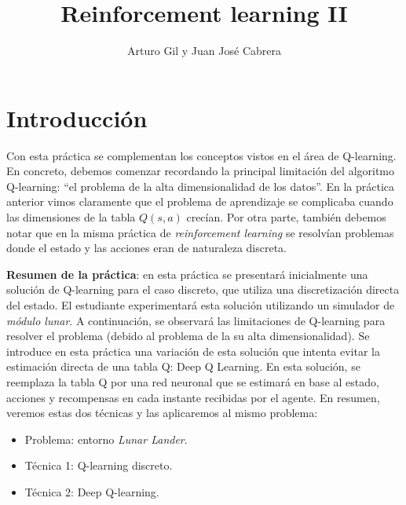 \documentclass{article}
\title{Reinforcement learning II}
\author{Arturo Gil y Juan José Cabrera}
\begin{document}
\maketitle

\section{Introducción}
Con esta práctica se complementan los conceptos vistos en el área de Q-learning. En concreto, debemos comenzar recordando la principal limitación del algoritmo Q-learning: ``el problema de la alta dimensionalidad de los datos''. En la práctica anterior vimos claramente que el problema de aprendizaje se complicaba cuando las dimensiones de la tabla $Q(s, a)$ crecían. Por otra parte, también debemos notar que en la misma práctica de \textit{reinforcement learning} se resolvían problemas donde el estado y las acciones eran de naturaleza discreta.

\textbf{Resumen de la práctica}: en esta práctica se presentará inicialmente una solución de Q-learning  para el caso discreto, que utiliza una discretización directa del estado. El estudiante experimentará esta solución utilizando un simulador de  \textit{módulo lunar}. A continuación, se observará las limitaciones de Q-learning para resolver el problema (debido al problema de la su alta dimensionalidad). Se introduce en esta práctica una variación de esta solución que intenta evitar la estimación directa de una tabla Q: Deep Q Learning. En esta solución, se reemplaza la tabla Q por una red neuronal que se estimará en base al estado, acciones y recompensas en cada instante recibidas por el agente. En resumen, veremos estas dos técnicas y las aplicaremos al mismo problema:
\begin{itemize}
    \item Problema: entorno \textit{Lunar Lander}.
    \item Técnica 1: Q-learning discreto.
    \item Técnica 2: Deep Q-learning.
\end{itemize}


  



\end{document}
